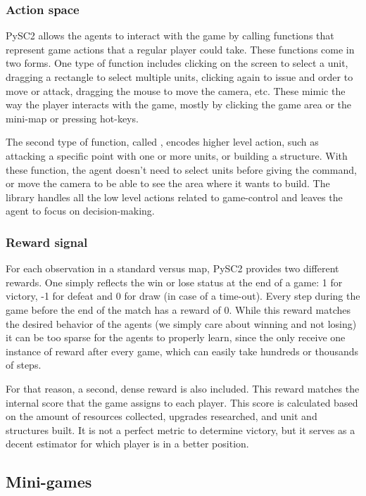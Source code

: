 \subsubsection*{Action space}

PySC2 allows the agents to interact with the game by calling functions that represent game actions that a regular player could take. These functions come in two forms. One type of function includes clicking on the screen to select a unit, dragging a rectangle to select multiple units, clicking again to issue and order to move or attack, dragging the mouse to move the camera, etc. These mimic the way the player interacts with the game, mostly by clicking the game area or the mini-map or pressing hot-keys.

The second type of function, called , encodes higher level action, such as attacking a specific point with one or more units, or building a structure. With these function, the agent doesn't need to select units before giving the command, or move the camera to be able to see the area where it wants to build. The library handles all the low level actions related to game-control and leaves the agent to focus on decision-making.

\subsubsection*{Reward signal}

For each observation in a standard versus map, PySC2 provides two different rewards. One simply reflects the win or lose status at the end of a game: 1 for victory, -1 for defeat and 0 for draw (in case of a time-out). Every step during the game before the end of the match has a reward of 0. While this reward matches the desired behavior of the agents (we simply care about winning and not losing) it can be too sparse for the agents to properly learn, since the only receive one instance of reward after every game, which can easily take hundreds or thousands of steps.

For that reason, a second, dense reward is also included. This reward matches the internal score that the game assigns to each player. This score is calculated based on the amount of resources collected, upgrades researched, and unit and structures built. It is not a perfect metric to determine victory, but it serves as a decent estimator for which player is in a better position.

\subsection{Mini-games}

